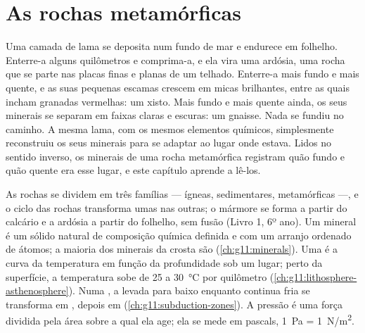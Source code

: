 \chapter{As rochas metamórficas}\label{ch:g12:metamorphic-rocks}

Uma camada de lama se deposita num fundo de mar e endurece em folhelho.
Enterre-a alguns quilômetros e comprima-a, e ela vira uma ardósia, uma rocha
que se parte nas placas finas e planas de um telhado. Enterre-a mais fundo e
mais quente, e as suas pequenas escamas crescem em micas brilhantes, entre
as quais incham granadas vermelhas: um xisto. Mais fundo e mais quente
ainda, os seus minerais se separam em faixas claras e escuras: um gnaisse.
Nada se fundiu no caminho. A mesma lama, com os mesmos elementos químicos,
simplesmente reconstruiu os seus minerais para se adaptar ao lugar onde
estava. Lidos no sentido inverso, os minerais de uma rocha metamórfica
registram quão fundo e quão quente era esse lugar, e este capítulo aprende a
lê-los.

\begin{recall}
As rochas se dividem em três famílias --- ígneas, sedimentares,
metamórficas ---, e o ciclo das rochas transforma umas nas outras; o mármore
se forma a partir do calcário e a ardósia a partir do folhelho, sem fusão
(Livro 1, 6º ano). Um mineral é um sólido natural de composição química
definida e com um arranjo ordenado de átomos; a maioria dos minerais da
crosta são  (\cref{ch:g11:minerals}). Uma  é a curva da
temperatura em função da profundidade sob um lugar; perto da superfície, a
temperatura sobe de 25 a \qty{30}{\celsius} por quilômetro
(\cref{ch:g11:lithosphere-asthenosphere}). Numa , a  levada para baixo enquanto continua fria se transforma em , depois em  (\cref{ch:g11:subduction-zones}). A pressão é uma
força dividida pela área sobre a qual ela age; ela se mede em pascals,
\qty{1}{Pa} = \qty{1}{N/m^2}.
\end{recall}

